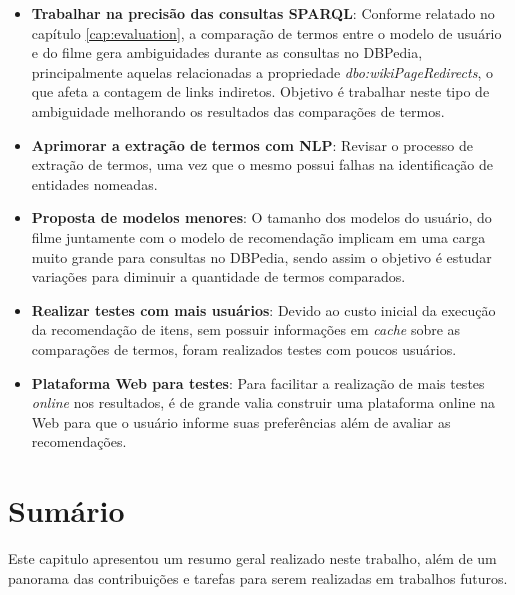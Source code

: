 \begin{itemize}
	\item{\textbf{Trabalhar na precisão das consultas \ac{SPARQL}}: Conforme relatado no capítulo \ref{cap:evaluation}, a comparação de termos entre o modelo de usuário e do filme gera ambiguidades durante as consultas no DBPedia, principalmente aquelas relacionadas a propriedade \textit{dbo:wikiPageRedirects},  o que afeta a contagem de links indiretos. Objetivo é trabalhar neste tipo de ambiguidade melhorando os resultados das comparações de termos.}
	
	\item{\textbf{Aprimorar a extração de termos com \ac{NLP}}: Revisar o processo de extração de termos, uma vez que o mesmo possui falhas na identificação de entidades nomeadas.}
	
	\item{\textbf{Proposta de modelos menores}: O tamanho dos modelos do usuário, do filme juntamente com o modelo de recomendação implicam em uma carga muito grande para consultas no DBPedia, sendo assim o objetivo é estudar variações para diminuir a quantidade de termos comparados.}
	
	\item{\textbf{Realizar testes com mais usuários}: Devido ao custo inicial da execução da recomendação de itens, sem possuir informações em \textit{cache} sobre as comparações de termos, foram realizados testes com poucos usuários.}

	\item{\textbf{Plataforma Web para testes}: Para facilitar a realização de mais testes \textit{online} nos resultados, é de grande valia construir uma plataforma online na Web para que o usuário informe suas preferências além de avaliar as recomendações.}
\end{itemize}

\section{Sumário}

Este capitulo apresentou um resumo geral realizado neste trabalho, além de um panorama das contribuições  e tarefas para serem realizadas em trabalhos futuros.